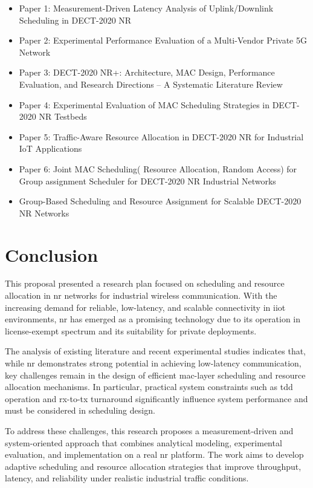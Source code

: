 \documentclass[12pt,a4paper]{article}
\begin{document}
\begin{itemize}
    \item Paper 1: Measurement-Driven Latency Analysis of Uplink/Downlink Scheduling in DECT-2020 NR
    \item Paper 2: Experimental Performance Evaluation of a Multi-Vendor Private 5G Network
    \item Paper 3: DECT-2020 NR+: Architecture, MAC Design, Performance Evaluation, and Research Directions -- A Systematic Literature Review
    \item Paper 4: Experimental Evaluation of MAC Scheduling Strategies in DECT-2020 NR Testbeds
    \item Paper 5: Traffic-Aware Resource Allocation in DECT-2020 NR for Industrial IoT Applications
    \item Paper 6: Joint MAC Scheduling( Resource Allocation, Random Access) for Group assignment Scheduler for DECT-2020 NR Industrial Networks
    \item  Group-Based Scheduling and Resource Assignment for Scalable DECT-2020 NR Networks
\end{itemize}


\section{Conclusion}

This proposal presented a research plan focused on scheduling and resource allocation in  \gls{nr} networks for industrial wireless communication. With the increasing demand for reliable, low-latency, and scalable connectivity in \gls{iiot} environments, \gls{nr} has emerged as a promising technology due to its operation in license-exempt spectrum and its suitability for private deployments.

The analysis of existing literature and recent experimental studies indicates that, while \gls{nr} demonstrates strong potential in achieving low-latency communication, key challenges remain in the design of efficient \gls{mac}-layer scheduling and resource allocation mechanisms. In particular, practical system constraints such as \gls{tdd} operation and \gls{rx}-to-\gls{tx} turnaround significantly influence system performance and must be considered in scheduling design.

To address these challenges, this research proposes a measurement-driven and system-oriented approach that combines analytical modeling, experimental evaluation, and implementation on a real \gls{nr} platform. The work aims to develop adaptive scheduling and resource allocation strategies that improve throughput, latency, and reliability under realistic industrial traffic conditions.
\end{document}
